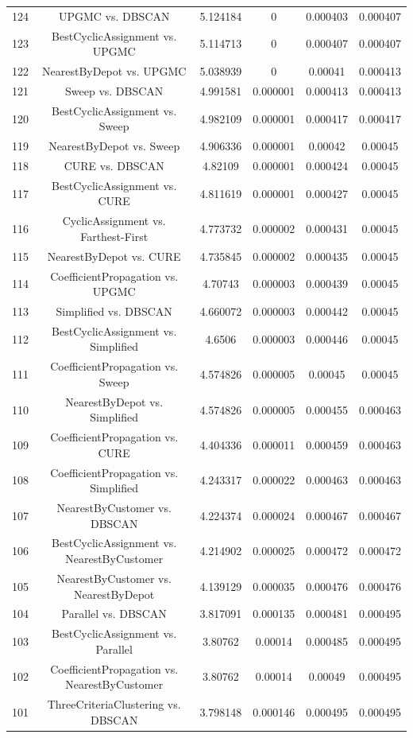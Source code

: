 \documentclass[a4paper,10pt]{article}
\begin{document}
\begin{landscape}
\begin{table}[!htp]
\begin{tabular}{cccccc}
124&UPGMC vs. DBSCAN&5.124184&0&0.000403&0.000407\\
123&BestCyclicAssignment vs. UPGMC&5.114713&0&0.000407&0.000407\\
122&NearestByDepot vs. UPGMC&5.038939&0&0.00041&0.000413\\
121&Sweep vs. DBSCAN&4.991581&0.000001&0.000413&0.000413\\
120&BestCyclicAssignment vs. Sweep&4.982109&0.000001&0.000417&0.000417\\
119&NearestByDepot vs. Sweep&4.906336&0.000001&0.00042&0.00045\\
118&CURE vs. DBSCAN&4.82109&0.000001&0.000424&0.00045\\
117&BestCyclicAssignment vs. CURE&4.811619&0.000001&0.000427&0.00045\\
116&CyclicAssignment vs. Farthest-First&4.773732&0.000002&0.000431&0.00045\\
115&NearestByDepot vs. CURE&4.735845&0.000002&0.000435&0.00045\\
114&CoefficientPropagation vs. UPGMC&4.70743&0.000003&0.000439&0.00045\\
113&Simplified vs. DBSCAN&4.660072&0.000003&0.000442&0.00045\\
112&BestCyclicAssignment vs. Simplified&4.6506&0.000003&0.000446&0.00045\\
111&CoefficientPropagation vs. Sweep&4.574826&0.000005&0.00045&0.00045\\
110&NearestByDepot vs. Simplified&4.574826&0.000005&0.000455&0.000463\\
109&CoefficientPropagation vs. CURE&4.404336&0.000011&0.000459&0.000463\\
108&CoefficientPropagation vs. Simplified&4.243317&0.000022&0.000463&0.000463\\
107&NearestByCustomer vs. DBSCAN&4.224374&0.000024&0.000467&0.000467\\
106&BestCyclicAssignment vs. NearestByCustomer&4.214902&0.000025&0.000472&0.000472\\
105&NearestByCustomer vs. NearestByDepot&4.139129&0.000035&0.000476&0.000476\\
104&Parallel vs. DBSCAN&3.817091&0.000135&0.000481&0.000495\\
103&BestCyclicAssignment vs. Parallel&3.80762&0.00014&0.000485&0.000495\\
102&CoefficientPropagation vs. NearestByCustomer&3.80762&0.00014&0.00049&0.000495\\
101&ThreeCriteriaClustering vs. DBSCAN&3.798148&0.000146&0.000495&0.000495\\

\end{tabular}
\end{table}
\end{landscape}
\end{document}
